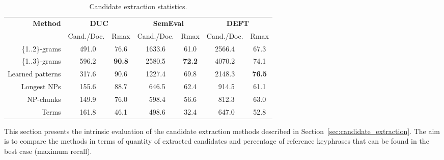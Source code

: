     \begin{table*}
      \centering
      \begin{tabular}{@{~}rcccccc@{~}}
        \toprule
        \multirow{2}{*}[-2pt]{\textbf{Method}} & \multicolumn{2}{c}{\textbf{DUC}} & \multicolumn{2}{c}{\textbf{SemEval}} & \multicolumn{2}{c}{\textbf{DEFT}}\\
        \cmidrule(r){2-3}\cmidrule(lr){4-5}\cmidrule(l){6-7}
        & Cand./Doc. & Rmax & Cand./Doc. & Rmax & Cand./Doc. & Rmax\\
        \midrule
        \{1..2\}-grams & $~~$491.0 & 76.6 & 1633.6 & 61.0 & 2566.4 & 67.3\\
        \{1..3\}-grams & $~~$596.2 & \textbf{90.8} & 2580.5 & \textbf{72.2} & 4070.2 & 74.1\\
        Learned patterns & $~~$317.6 & 90.6 & 1227.4 & 69.8 & 2148.3 & \textbf{76.5}\\
        Longest NPs & $~~$155.6 & 88.7 & $~~$646.5 & 62.4 & $~~$914.5 & 61.1\\
        NP-chunks & $~~$149.9 & 76.0 & $~~$598.4 & 56.6 & $~~$812.3 & 63.0\\
        Terms & $~~$161.8 & 46.1 & $~~$498.6 & 32.4 & $~~$647.0 & 52.8\\
        \bottomrule
      \end{tabular}
      \caption{Candidate extraction statistics.
               \label{tab:candidate_extraction_statistics}}
    \end{table*}

    This section presents the intrinsic evaluation of the candidate extraction
    methods described in Section~\ref{sec:candidate_extraction}. The aim is to
    compare the methods in terms of quantity of extracted candidates and
    percentage of reference keyphrases that can be found in the best case
    (maximum recall).

